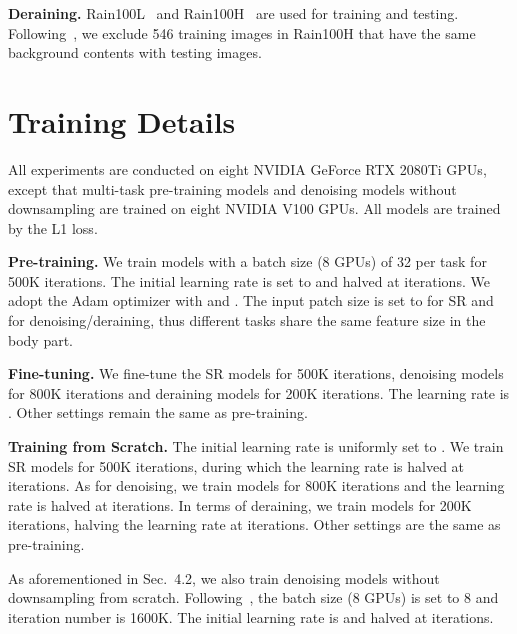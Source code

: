 \documentclass[runningheads]{llncs}
\begin{document}
	\vspace{0.05in}
	\noindent\textbf{Deraining.} Rain100L~\cite{yang2019joint} and Rain100H~\cite{yang2019joint} are used for training and testing. Following~\cite{ren2019progressive}, we exclude 546 training images in Rain100H that have the same background contents with testing images.
	


	\section{Training Details}
	
	All experiments are conducted on eight NVIDIA GeForce RTX 2080Ti GPUs, except that multi-task pre-training models and denoising models without downsampling are trained on eight NVIDIA V100 GPUs. All models are trained by the L1 loss.
	
	
	\vspace{0.05in}
	\noindent\textbf{Pre-training.} We train models with a batch size (8 GPUs) of 32 per task for 500K iterations. The initial learning rate is set to  and halved at  iterations. We adopt the Adam optimizer with  and . The input patch size is set to  for SR and  for denoising/deraining, thus different tasks share the same feature size  in the body part.
	
	\vspace{0.05in}
	\noindent\textbf{Fine-tuning.} We fine-tune the SR models for 500K iterations, denoising models for 800K iterations and deraining models for 200K iterations. The learning rate is . Other settings remain the same as pre-training.
	
	\vspace{0.05in}
	\noindent\textbf{Training from Scratch.} The initial learning rate is uniformly set to . We train SR models for 500K iterations, during which the learning rate is halved at  iterations. As for denoising, we train models for 800K iterations and the learning rate is halved at  iterations. In terms of deraining, we train models for 200K iterations, halving the learning rate at  iterations. Other settings are the same as pre-training.
	
	As aforementioned in Sec.~{4.2}, we also train denoising models without downsampling from scratch. Following~\cite{liang2021swinir}, the batch size (8 GPUs) is set to 8 and iteration number is 1600K. The initial learning rate is  and halved at  iterations.
	
\end{document}
